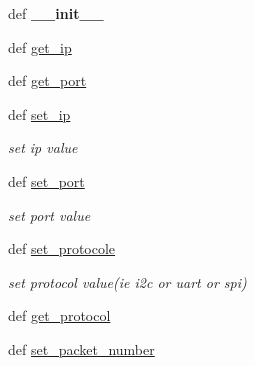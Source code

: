 \begin{DoxyCompactItemize}
\item 
\hypertarget{classConfigurationServer_1_1ConfigurationServer_ab3812cc3c79614fef4fd6313b6daf644}{def {\bfseries \+\_\+\+\_\+init\+\_\+\+\_\+}}\label{classConfigurationServer_1_1ConfigurationServer_ab3812cc3c79614fef4fd6313b6daf644}

\item 
def \hyperlink{classConfigurationServer_1_1ConfigurationServer_ad567cfecce426350ca8d12acd40c9744}{get\+\_\+ip}
\item 
def \hyperlink{classConfigurationServer_1_1ConfigurationServer_a51cbe5a81222c5c6a2802e89c73394c4}{get\+\_\+port}
\item 
def \hyperlink{classConfigurationServer_1_1ConfigurationServer_a9769cb69630312ce2413b2776451b832}{set\+\_\+ip}
\begin{DoxyCompactList}\small\item\em set ip value \end{DoxyCompactList}\item 
def \hyperlink{classConfigurationServer_1_1ConfigurationServer_aab99e4fa633e026c619bac03364757aa}{set\+\_\+port}
\begin{DoxyCompactList}\small\item\em set port value \end{DoxyCompactList}\item 
def \hyperlink{classConfigurationServer_1_1ConfigurationServer_ad31024ecc213fd80f180afaeca67c1fa}{set\+\_\+protocole}
\begin{DoxyCompactList}\small\item\em set protocol value(ie i2c or uart or spi) \end{DoxyCompactList}\item 
def \hyperlink{classConfigurationServer_1_1ConfigurationServer_a6381c30b4b4b0bc2b21d3b97c7c9bb44}{get\+\_\+protocol}
\item 
\hypertarget{classConfigurationServer_1_1ConfigurationServer_a575c3d46fcbb3090724748c11300ff22}{def \hyperlink{classConfigurationServer_1_1ConfigurationServer_a575c3d46fcbb3090724748c11300ff22}{set\+\_\+packet\+\_\+number}}\label{classConfigurationServer_1_1ConfigurationServer_a575c3d46fcbb3090724748c11300ff22}


\end{DoxyCompactItemize}
